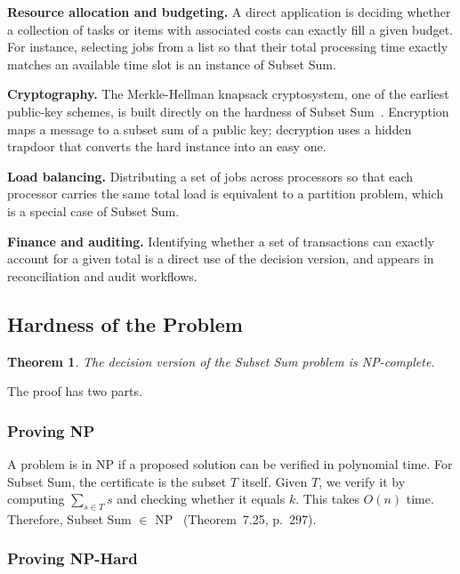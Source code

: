 \documentclass[12pt,a4paper]{article}
\newtheorem{theorem}{Theorem}[section]
\theoremstyle{definition}
\begin{document}
\textbf{Resource allocation and budgeting.}
A direct application is deciding whether a collection of tasks or items with
associated costs can exactly fill a given budget. For instance, selecting jobs
from a list so that their total processing time exactly matches an available
time slot is an instance of Subset Sum.

\textbf{Cryptography.}
The Merkle-Hellman knapsack cryptosystem, one of the earliest public-key
schemes, is built directly on the hardness of Subset Sum~\cite{garey}. Encryption
maps a message to a subset sum of a public key; decryption uses a hidden
trapdoor that converts the hard instance into an easy one.

\textbf{Load balancing.}
Distributing a set of jobs across processors so that each processor carries
the same total load is equivalent to a partition problem, which is a special
case of Subset Sum.

\textbf{Finance and auditing.}
Identifying whether a set of transactions can exactly account for a given
total is a direct use of the decision version, and appears in reconciliation
and audit workflows.

\subsection{Hardness of the Problem}

\begin{theorem}
  The decision version of the Subset Sum problem is NP-complete.
\end{theorem}

The proof has two parts.

\subsubsection{Proving NP}

A problem is in NP if a proposed solution can be verified in polynomial time.
For Subset Sum, the certificate is the subset $T$ itself. Given $T$, we verify
it by computing $\sum_{s \in T} s$ and checking whether it equals $k$. This
takes $O(n)$ time. Therefore, Subset Sum $\in$ NP~\cite{sipser} (Theorem~7.25,
p.~297).

\subsubsection{Proving NP-Hard}
\end{document}

